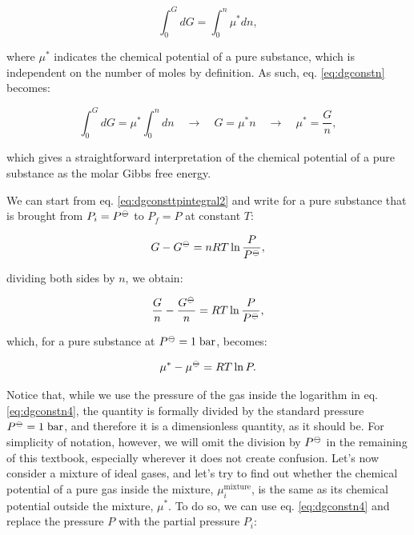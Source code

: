 \documentclass[
  9pt,
]{extbook}
\theoremstyle{definition}
\theoremstyle{definition}
\theoremstyle{definition}
\theoremstyle{remark}
\begin{document}
\begin{equation}
\int_0^G d G = \int_0^n \mu^* dn,
\label{eq:dgconstn}
\end{equation}

where \(\mu^*\) indicates the chemical potential of a pure substance, which is independent on the number of moles by definition. As such, eq. \eqref{eq:dgconstn} becomes:

\begin{equation}
\int_0^G d G = \mu^* \int_0^n dn \quad \rightarrow \quad G = \mu^* n \quad \rightarrow \quad \mu^* = \frac{G}{n},
\label{eq:dgconstn1}
\end{equation}

which gives a straightforward interpretation of the chemical potential of a pure substance as the molar Gibbs free energy.

We can start from eq. \eqref{eq:dgconsttpintegral2} and write for a pure substance that is brought from \(P_i=P^{-\kern-6pt{\ominus}\kern-6pt-}\) to \(P_f=P\) at constant \(T\):

\begin{equation}
G - G^{-\kern-6pt{\ominus}\kern-6pt-}= nRT \ln \frac{P}{P^{-\kern-6pt{\ominus}\kern-6pt-}},
\label{eq:dgconstn2}
\end{equation}

dividing both sides by \(n\), we obtain:

\begin{equation}
\frac{G}{n} - \frac{G^{-\kern-6pt{\ominus}\kern-6pt-}}{n} = RT \ln \frac{P}{P^{-\kern-6pt{\ominus}\kern-6pt-}},
\label{eq:dgconstn3}
\end{equation}

which, for a pure substance at \(P^{-\kern-6pt{\ominus}\kern-6pt-}= 1 \;\text{bar}\), becomes:

\begin{equation}
\mu^* - \mu^{-\kern-6pt{\ominus}\kern-6pt-}=      RT \ln P.
\label{eq:dgconstn4}
\end{equation}

Notice that, while we use the pressure of the gas inside the logarithm in eq. \eqref{eq:dgconstn4}, the quantity is formally divided by the standard pressure \(P^{-\kern-6pt{\ominus}\kern-6pt-}= 1 \;\text{bar}\), and therefore it is a dimensionless quantity, as it should be. For simplicity of notation, however, we will omit the division by \(P^{-\kern-6pt{\ominus}\kern-6pt-}\) in the remaining of this textbook, especially wherever it does not create confusion.
Let's now consider a mixture of ideal gases, and let's try to find out whether the chemical potential of a pure gas inside the mixture, \(\mu_i^{\text{mixture}}\), is the same as its chemical potential outside the mixture, \(\mu^*\).
To do so, we can use eq. \eqref{eq:dgconstn4} and replace the pressure \(P\) with the partial pressure \(P_i\):
\end{document}
